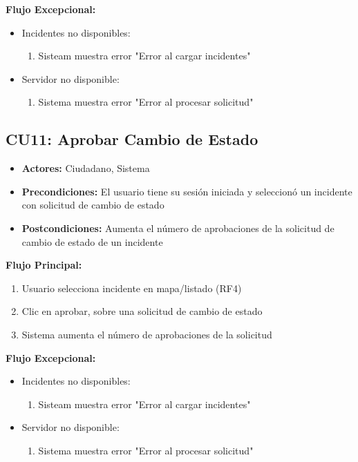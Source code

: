 \begin{multicols}{2}
\textbf{Flujo Excepcional:}
\begin{itemize}
    \item Incidentes no disponibles:
    \begin{enumerate}
        \item Sisteam muestra error "Error al cargar incidentes"
    \end{enumerate}
    \item Servidor no disponible:
    \begin{enumerate}
        \item Sistema muestra error "Error al procesar solicitud"
    \end{enumerate}
\end{itemize}

\subsection*{CU11: Aprobar Cambio de Estado}
\begin{itemize}
    \item \textbf{Actores:} Ciudadano, Sistema
    \item \textbf{Precondiciones:} El usuario tiene su sesión iniciada y seleccionó un incidente con solicitud de cambio de estado
    \item \textbf{Postcondiciones:} Aumenta el número de aprobaciones de la solicitud de cambio de estado de un incidente
\end{itemize}
\textbf{Flujo Principal:}
\begin{enumerate}
    \item Usuario selecciona incidente en mapa/listado (RF4)
    \item Clic en aprobar, sobre una solicitud de cambio de estado
    \item Sistema aumenta el número de aprobaciones de la solicitud
\end{enumerate}

\textbf{Flujo Excepcional:}
\begin{itemize}
    \item Incidentes no disponibles:
    \begin{enumerate}
        \item Sisteam muestra error "Error al cargar incidentes"
    \end{enumerate}
    \item Servidor no disponible:
    \begin{enumerate}
        \item Sistema muestra error "Error al procesar solicitud"
    \end{enumerate}
\end{itemize}


\end{multicols}

